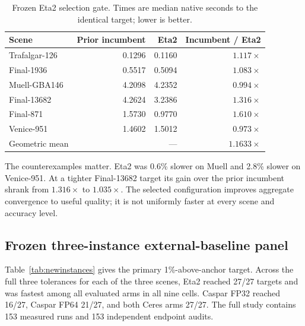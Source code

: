 \documentclass[10pt]{article}
\begin{document}
\begin{table}[ht]
\centering
\small
\caption{Frozen Eta2 selection gate.  Times are median native seconds to the identical target; lower is better.}
\label{tab:sixscene}
\begin{tabular}{@{}lrrr@{}}
\toprule
Scene & Prior incumbent & Eta2 & Incumbent / Eta2\\
\midrule
Trafalgar-126 & 0.1296 & 0.1160 & $1.117\times$\\
Final-1936 & 0.5517 & 0.5094 & $1.083\times$\\
Muell-GBA146 & 4.2098 & 4.2352 & $0.994\times$\\
Final-13682 & 4.2624 & 3.2386 & $1.316\times$\\
Final-871 & 1.5730 & 0.9770 & $1.610\times$\\
Venice-951 & 1.4602 & 1.5012 & $0.973\times$\\
\midrule
Geometric mean & \multicolumn{2}{r}{---} & $1.1633\times$\\
\bottomrule
\end{tabular}
\end{table}

The counterexamples matter.  Eta2 was 0.6\% slower on Muell and 2.8\% slower on Venice-951.  At a tighter Final-13682 target its gain over the prior incumbent shrank from $1.316\times$ to $1.035\times$.  The selected configuration improves aggregate convergence to useful quality; it is not uniformly faster at every scene and accuracy level.

\subsection{Frozen three-instance external-baseline panel}

Table~\ref{tab:newinstances} gives the primary 1\%-above-anchor target.  Across the full three tolerances for each of the three scenes, Eta2 reached 27/27 targets and was fastest among all evaluated arms in all nine cells.  Caspar\cite{Caspar2026} FP32 reached 16/27, Caspar FP64 21/27, and both Ceres\cite{Ceres} arms 27/27.  The full study contains 153 measured runs and 153 independent endpoint audits.
\end{document}
